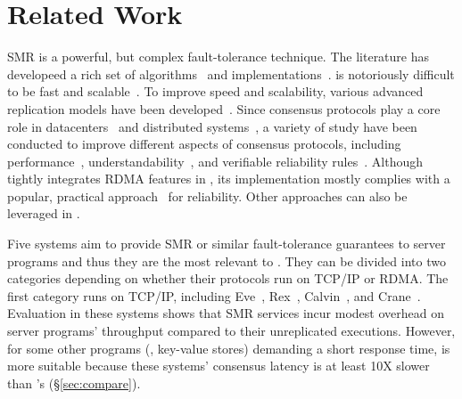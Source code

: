 \section{Related Work} \label{sec:related}


  SMR is a powerful, but 
complex fault-tolerance technique. The literature has developeed a rich set of
\paxos 
algorithms~\cite{paxos:practical,paxos,paxos:simple,paxos:complex,epaxos:sosp13}
and implementations~\cite{paxos:live,paxos:practical,chubby:osdi}. \paxos is 
notoriously difficult to be fast and scalable~\cite{ellis:thesis}. To improve 
speed and scalability, various advanced replication models have been 
developed~\cite{epaxos:sosp13,mencius:osdi08,scatter:sosp11,manos:hotdep10}. 
Since consensus protocols play a core role in 
datacenters~\cite{matei:hotcloud11, mesos:nsdi11, datacenter:os} and distributed 
systems~\cite{spanner:osdi12,mencius:osdi08}, a variety of study have been 
conducted to improve different aspects of consensus protocols, including 
performance~\cite{epaxos:sosp13,paxos:fast,dare:hpdc15}, 
understandability~\cite{raft:usenix14,paxos}, and verifiable reliability 
rules~\cite{modist:nsdi09,demeter:sosp11}. Although \xxx tightly integrates 
RDMA features in \paxos, its implementation mostly complies with a popular, 
practical approach~\cite{paxos:practical} for reliability. Other \paxos 
approaches can also be leveraged in \xxx.

Five systems aim to provide SMR or similar fault-tolerance guarantees to server 
programs and thus they are the most relevant to \xxx. They can be divided into 
two categories depending on whether their protocols run on TCP/IP or RDMA. 
The first category runs on TCP/IP, including Eve~\cite{eve:osdi12}, 
Rex~\cite{rex:eurosys14}, Calvin~\cite{calvin:sigmod12}, and 
Crane~\cite{crane:sosp15}. Evaluation in these systems shows that SMR 
services incur modest overhead on server programs' throughput compared to their 
unreplicated executions. However, for some other programs (\eg, key-value 
stores) demanding a short response time, \xxx is more suitable because these 
systems' consensus latency is at least 10X slower than 
\xxx's (\S\ref{sec:compare}).


